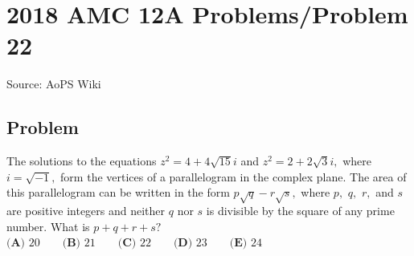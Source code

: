 \documentclass[12pt]{article}
\begin{document}
\section*{{2018 AMC 12A Problems/Problem 22}}
Source: AoPS Wiki

\subsection*{Problem}
The solutions to the equations $z^2=4+4\sqrt{15}i$ and $z^2=2+2\sqrt 3i,$ where $i=\sqrt{-1},$ form the vertices of a parallelogram in the complex plane. The area of this parallelogram can be written in the form $p\sqrt q-r\sqrt s,$ where $p,$ $q,$ $r,$ and $s$ are positive integers and neither $q$ nor $s$ is divisible by the square of any prime number. What is $p+q+r+s?$ $\textbf{(A) } 20 \qquad \textbf{(B) } 21 \qquad \textbf{(C) } 22 \qquad \textbf{(D) } 23 \qquad \textbf{(E) } 24$
\end{document}
